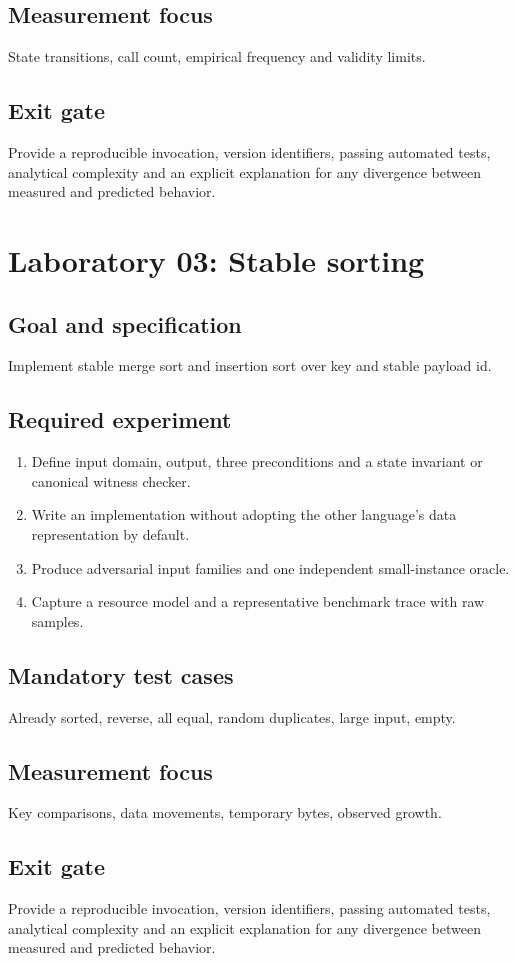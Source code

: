 \documentclass[11pt,letterpaper]{article}
\begin{document}
\subsection{Measurement focus}
State transitions, call count, empirical frequency and validity limits.
\subsection{Exit gate}
Provide a reproducible invocation, version identifiers, passing automated tests, analytical complexity and an explicit explanation for any divergence between measured and predicted behavior.

\section{Laboratory 03: Stable sorting}
\subsection{Goal and specification}
Implement stable merge sort and insertion sort over key and stable payload id.
\subsection{Required experiment}
\begin{enumerate}
\item Define input domain, output, three preconditions and a state invariant or canonical witness checker.
\item Write an implementation without adopting the other language's data representation by default.
\item Produce adversarial input families and one independent small-instance oracle.
\item Capture a resource model and a representative benchmark trace with raw samples.
\end{enumerate}
\subsection{Mandatory test cases}
Already sorted, reverse, all equal, random duplicates, large input, empty.
\subsection{Measurement focus}
Key comparisons, data movements, temporary bytes, observed growth.
\subsection{Exit gate}
Provide a reproducible invocation, version identifiers, passing automated tests, analytical complexity and an explicit explanation for any divergence between measured and predicted behavior.
\end{document}
